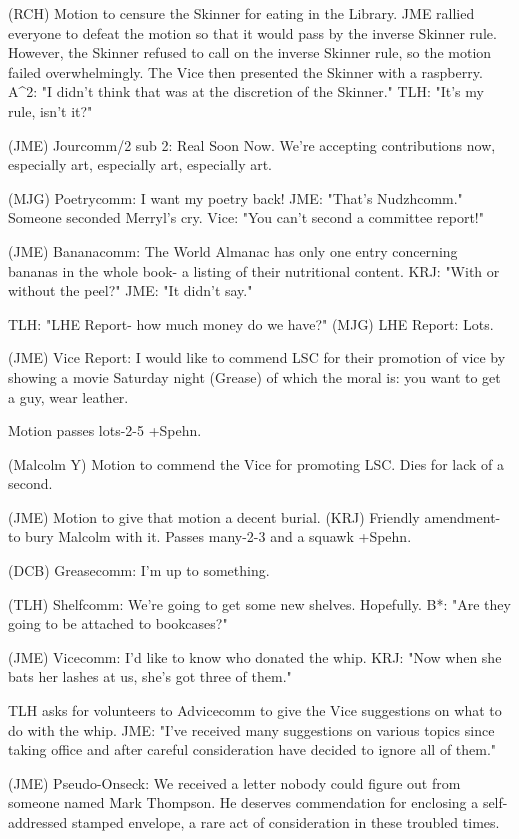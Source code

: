 \documentclass[12pt]{article}
\begin{document}
(RCH) Motion to censure the Skinner for eating in the Library. JME rallied everyone to defeat the motion so that it would pass by the inverse Skinner rule. However, the Skinner refused to call on the inverse Skinner rule, so the motion failed overwhelmingly. The Vice then presented the Skinner with a raspberry. A^2: "I didn't think that was at the discretion of the Skinner." TLH: "It's my rule, isn't it?"

(JME) Jourcomm/2 sub 2: Real Soon Now. We're accepting contributions now, especially art, especially art, especially art.

(MJG) Poetrycomm: I want my poetry back! JME: "That's Nudzhcomm." Someone seconded Merryl's cry. Vice: "You can't second a committee report!"

(JME) Bananacomm: The World Almanac has only one entry concerning bananas in the whole book- a listing of their nutritional content. KRJ: "With or without the peel?" JME: "It didn't say."

TLH: "LHE Report- how much money do we have?" (MJG) LHE Report: Lots.

(JME) Vice Report: I would like to commend LSC for their promotion of vice by showing a movie Saturday night (Grease) of which the moral is: you want to get a guy, wear leather.

Motion passes lots-2-5 +Spehn.

(Malcolm Y) Motion to commend the Vice for promoting LSC. Dies for lack of a second.

(JME) Motion to give that motion a decent burial. (KRJ) Friendly amendment- to bury Malcolm with it. Passes many-2-3 and a squawk +Spehn.

(DCB) Greasecomm: I'm up to something.

(TLH) Shelfcomm: We're going to get some new shelves. Hopefully. B*: "Are they going to be attached to bookcases?"

(JME) Vicecomm: I'd like to know who donated the whip. KRJ: "Now when she bats her lashes at us, she's got three of them."

TLH asks for volunteers to Advicecomm to give the Vice suggestions on what to do with the whip. JME: "I've received many suggestions on various topics since taking office and after careful consideration have decided to ignore all of them."

(JME) Pseudo-Onseck: We received a letter nobody could figure out from someone named Mark Thompson. He deserves commendation for enclosing a self-addressed stamped envelope, a rare act of consideration in these troubled times.
\end{document}
